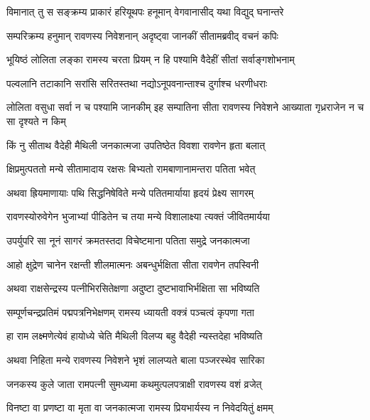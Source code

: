 
\twolineshloka
{विमानात् तु स सङ्क्रम्य प्राकारं हरियूथपः}
{हनूमान् वेगवानासीद् यथा विद्युद् घनान्तरे} %

\twolineshloka
{सम्परिक्रम्य हनुमान् रावणस्य निवेशनान्}
{अदृष्ट्वा जानकीं सीतामब्रवीद् वचनं कपिः} %

\twolineshloka
{भूयिष्ठं लोलिता लङ्का रामस्य चरता प्रियम्}
{न हि पश्यामि वैदेहीं सीतां सर्वाङ्गशोभनाम्} %

\twolineshloka
{पल्वलानि तटाकानि सरांसि सरितस्तथा}
{नद्योऽनूपवनान्ताश्च दुर्गाश्च धरणीधराः} %

\threelineshloka
{लोलिता वसुधा सर्वा न च पश्यामि जानकीम्}
{इह सम्पातिना सीता रावणस्य निवेशने}
{आख्याता गृध्रराजेन न च सा दृश्यते न किम्} %

\twolineshloka
{किं नु सीताथ वैदेही मैथिली जनकात्मजा}
{उपतिष्ठेत विवशा रावणेन हृता बलात्} %

\twolineshloka
{क्षिप्रमुत्पततो मन्ये सीतामादाय रक्षसः}
{बिभ्यतो रामबाणानामन्तरा पतिता भवेत्} %

\twolineshloka
{अथवा ह्रियमाणायाः पथि सिद्धनिषेविते}
{मन्ये पतितमार्याया हृदयं प्रेक्ष्य सागरम्} %

\twolineshloka
{रावणस्योरुवेगेन भुजाभ्यां पीडितेन च}
{तया मन्ये विशालाक्ष्या त्यक्तं जीवितमार्यया} %

\twolineshloka
{उपर्युपरि सा नूनं सागरं क्रमतस्तदा}
{विचेष्टमाना पतिता समुद्रे जनकात्मजा} %

\twolineshloka
{आहो क्षुद्रेण चानेन रक्षन्ती शीलमात्मनः}
{अबन्धुर्भक्षिता सीता रावणेन तपस्विनी} %

\twolineshloka
{अथवा राक्षसेन्द्रस्य पत्नीभिरसितेक्षणा}
{अदुष्टा दुष्टभावाभिर्भक्षिता सा भविष्यति} %

\twolineshloka
{सम्पूर्णचन्द्रप्रतिमं पद्मपत्रनिभेक्षणम्}
{रामस्य ध्यायती वक्त्रं पञ्चत्वं कृपणा गता} %

\twolineshloka
{हा राम लक्ष्मणेत्येवं हायोध्ये चेति मैथिली}
{विलप्य बहु वैदेही न्यस्तदेहा भविष्यति} %

\twolineshloka
{अथवा निहिता मन्ये रावणस्य निवेशने}
{भृशं लालप्यते बाला पञ्जरस्थेव सारिका} %

\twolineshloka
{जनकस्य कुले जाता रामपत्नी सुमध्यमा}
{कथमुत्पलपत्राक्षी रावणस्य वशं व्रजेत्} %

\twolineshloka
{विनष्टा वा प्रणष्टा वा मृता वा जनकात्मजा}
{रामस्य प्रियभार्यस्य न निवेदयितुं क्षमम्} %

